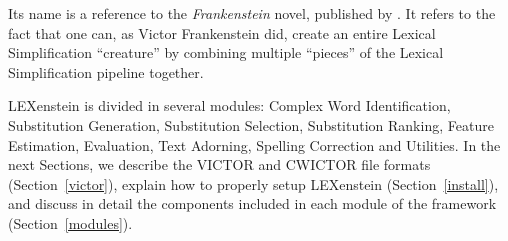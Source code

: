 Its name is a reference to the \textit{Frankenstein} novel, published by \cite{frankenstein}. It refers to the fact that one can, as Victor Frankenstein did, create an entire Lexical Simplification ``creature'' by combining multiple ``pieces'' of the Lexical Simplification pipeline together.

LEXenstein is divided in several modules: Complex Word Identification, Substitution Generation, Substitution Selection, Substitution Ranking, Feature Estimation, Evaluation, Text Adorning, Spelling Correction and Utilities. In the next Sections, we describe the VICTOR and CWICTOR file formats (Section~\ref{victor}), explain how to properly setup LEXenstein (Section~\ref{install}), and discuss in detail the components included in each module of the framework (Section~\ref{modules}).